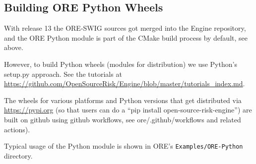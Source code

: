 

\subsection{Building ORE Python Wheels}\label{sec:oreswig}

With release 13 the ORE-SWIG sources got merged into the Engine repository, and the ORE Python module is part of the
CMake build process by default, see above.

However, to build Python wheels (modules for distribution) we use Python's setup.py approach.
See the tutorials at \url{https://github.com/OpenSourceRisk/Engine/blob/master/tutorials_index.md}.

The wheels for various platforms and Python versions that get distributed via \url{https://pypi.org} (so that users can
do a ``pip install open-source-risk-engine'') are built on github using github workflows, see ore/.github/workflows and related actions).

\medskip
Typical usage of the Python module is shown in ORE's {\tt Examples/ORE-Python} directory.

